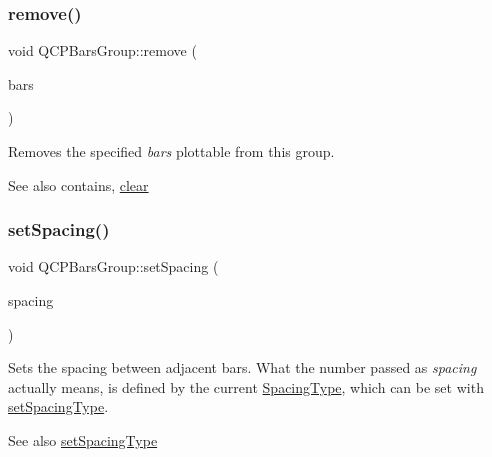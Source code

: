 \subsubsection{\texorpdfstring{remove()}{remove()}}
{\footnotesize\ttfamily void Q\+C\+P\+Bars\+Group\+::remove (\begin{DoxyParamCaption}\item[{\hyperlink{class_q_c_p_bars}{Q\+C\+P\+Bars} $\ast$}]{bars }\end{DoxyParamCaption})}

Removes the specified {\itshape bars} plottable from this group.

\begin{DoxySeeAlso}{See also}
contains, \hyperlink{class_q_c_p_bars_group_a3ddf23928c6cd89530bd34ab7ba7b177}{clear} 
\end{DoxySeeAlso}
\mbox{\label{class_q_c_p_bars_group_aa553d327479d72a0c3dafcc724a190e2}} 
\subsubsection{\texorpdfstring{set\+Spacing()}{setSpacing()}}
{\footnotesize\ttfamily void Q\+C\+P\+Bars\+Group\+::set\+Spacing (\begin{DoxyParamCaption}\item[{double}]{spacing }\end{DoxyParamCaption})}

Sets the spacing between adjacent bars. What the number passed as {\itshape spacing} actually means, is defined by the current \hyperlink{class_q_c_p_bars_group_a4c0521120a97e60bbca37677a37075b6}{Spacing\+Type}, which can be set with \hyperlink{class_q_c_p_bars_group_a2c7e2d61b10594a4555b615e1fcaf49e}{set\+Spacing\+Type}.

\begin{DoxySeeAlso}{See also}
\hyperlink{class_q_c_p_bars_group_a2c7e2d61b10594a4555b615e1fcaf49e}{set\+Spacing\+Type} 
\end{DoxySeeAlso}
\mbox{\label{class_q_c_p_bars_group_a2c7e2d61b10594a4555b615e1fcaf49e}} 
